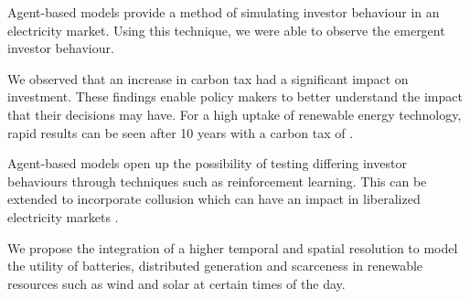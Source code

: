 
Agent-based models provide a method of simulating investor behaviour in an electricity market. Using this technique, we were able to observe the emergent investor behaviour. 

We observed that an increase in carbon tax had a significant impact on investment. These findings enable policy makers to better understand the impact that their decisions may have. For a high uptake of renewable energy technology, rapid results can be seen after 10 years with a carbon tax of .

Agent-based models open up the possibility of testing differing investor behaviours through techniques such as reinforcement learning. This can be extended to incorporate collusion which can have an impact in liberalized electricity markets \cite{Benjamin2016}.

We propose the integration of a higher temporal and spatial resolution to model the utility of batteries, distributed generation and scarceness in renewable resources such as wind and solar at certain times of the day.


\FloatBarrier